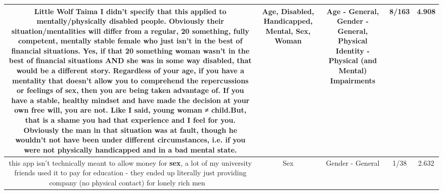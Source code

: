 \documentclass[11pt]{article}
\newlength\mylength
\begin{document}
\begin{center}
\begin{longtable}{|C{.65\mylength}|C{.30\mylength}|C{.12\mylength}|C{.12\mylength}|C{.12\mylength}|}
  \small Little Wolf Taima I didn't specify that this applied to mentally/physically \textbf{disabled} people. Obviously their situation/mentalities will differ from a regular, 20 something, fully competent, mentally stable female who just isn't in the best of financial situations. Yes, if that 20 something \textbf{woman} wasn't in the best of financial situations AND she was in some way \textbf{disabled}, that would be a different story. Regardless of your \textbf{age}, if you have a mentality that doesn't allow you to comprehend the repercussions or feelings of \textbf{sex}, then you are being taken advantage of. If you have a stable, healthy mindset and have made the decision at your own free will, you are not. Like I said, young \textbf{woman} ≠ child.But, that is a shame you had that experience and I feel for you. Obviously the man in that situation was at fault, though he wouldn't not have been under different circumstances, i.e. if you were not physically \textbf{handicapped} and in a bad \textbf{mental} state.\normalsize   & Age, Disabled, Handicapped, Mental, Sex, Woman & Age - General, Gender - General, Physical Identity - Physical (and Mental) Impairments & 8/163 & 4.908 \\  \hline
  \small this app isn't technically meant to allow money for \textbf{sex}, a lot of my university friends used it to pay for education - they ended up literally just providing company (no physical contact) for lonely rich men 🤷‍♀️\normalsize   & Sex & Gender - General & 1/38 & 2.632 \\  \hline

\end{longtable}
\end{center}
\end{document}
